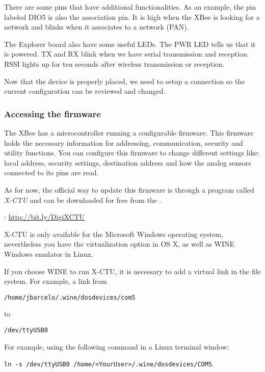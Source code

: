 There are some pins that have additional functionalities.
As an example, the pin labeled DIO5 is also the association pin.
It is high when the XBee is looking for a network and blinks when it associates to a network (PAN).

The Explorer board also have some useful LEDs.
The PWR LED tells us that it is powered.
TX and RX blink when we have serial transmission and reception.
RSSI lights up for ten seconds after wireless transmission or reception.

Now that the device is properly placed, we need to setup a connection so the current configuration can be reviewed and changed.

\subsubsection{Accessing the firmware}\label{xbeeRoleConfiguration}

The XBee has a microcontroller running a configurable firmware. This firmware holds the necessary information for addressing, communication, security and utility functions. You can configure this firmware to change different settings like: local address, security settings, destination address and how the analog sensors connected to its pins are read.

As for now, the official way to update this firmware is through a program called \emph{X-CTU} and can be downloaded for free from the \emph{}.

\emph{}: \url{http://bit.ly/DigiXCTU}

X-CTU is only available for the Microsoft Windows operating system, nevertheless you have the virtualization option in OS X, as well as WINE Windows emulator in Linux. 


If you choose WINE to run X-CTU, it is necessary to add a virtual link in the file system.
For example, a link from

\texttt{/home/jbarcelo/.wine/dosdevices/com5} 

to

\texttt{/dev/ttyUSB0}

For example, using the following command in a Linux terminal window: 

{\scriptsize{\texttt{ln -s /dev/ttyUSB0 /home/<YourUser>/.wine/dosdevices/COM5}}}.



